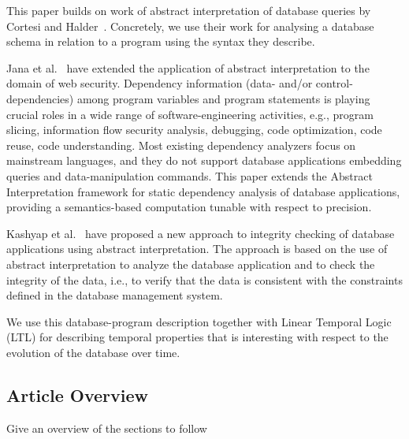 

This paper builds on work of abstract interpretation of database queries by Cortesi and Halder~\cite{halder_abstract_2012}.
Concretely, we use their work for analysing a database schema in relation to a program using the syntax they describe.


Jana et al.~\cite{jana_extending_2020} have extended the application of abstract interpretation to the domain of web security.
Dependency information (data- and/or control-dependencies) among program variables and program statements is playing crucial roles in a wide range of software-engineering activities, e.g., program slicing, information flow security analysis, debugging, code optimization, code reuse, code understanding.
Most existing dependency analyzers focus on mainstream languages, and they do not support database applications embedding queries and data-manipulation commands.
This paper extends the Abstract Interpretation framework for static dependency analysis of database applications, providing a semantics-based computation tunable with respect to precision.

Kashyap et al.~\cite{kashyap_integrity_2022} have proposed a new approach to integrity checking of database applications using abstract interpretation.
The approach is based on the use of abstract interpretation to analyze the database application and to check the integrity of the data, i.e., to verify that the data is consistent with the constraints defined in the database management system.

We use this database-program description together with Linear Temporal Logic (LTL) for describing temporal properties that is interesting with respect to the evolution of the database over time.

\subsection{Article Overview}\label{subsec:article-overview}
Give an overview of the sections to follow


